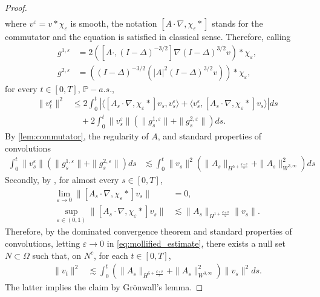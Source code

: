 \documentclass[a4paper,10pt]{amsart}
\renewcommand{\epsilon}{\varepsilon}
\theoremstyle{remark}
\numberwithin{equation}{section}
\begin{document}
\begin{proof}
\begin{align*}
\end{align*}
    where $v^{\epsilon}=v\ast \chi_{\epsilon}$ is smooth, the notation $[A\cdot\nabla,\chi_{\epsilon}\ast]$ stands for the commutator and the equation is satisfied in classical sense. Therefore, calling 
    \begin{align*}
        g^{1,\epsilon}&=2\left([A\cdot,(I-\Delta)^{-3/2}]\nabla(I-\Delta)^{3/2}v\right)\ast \chi_{\epsilon},\\
        g^{2,\epsilon}&=\left((I-\Delta)^{-3/2}\left(|A|^2(I-\Delta)^{3/2}v\right)\right)\ast\chi_{\epsilon},
    \end{align*}
    for every $t\in[0,T]$, $\mathbb{P}-a.s.$,
    \begin{align}\label{eq:mollified_estimate}
        \|v^{\epsilon}_t\|^2&\leq
        2\int_0^t\left|
        \langle [A_s\cdot\nabla,\chi_{\epsilon}\ast]v_s,v^{\epsilon}_s\rangle
        +\langle v^{\epsilon}_s,[A_s\cdot\nabla,\chi_{\epsilon}\ast]v_s\rangle
        \right|ds\\
        &\quad+2\int_0^t \|v^{\epsilon}_s\|
        \left(\|g^{1,\epsilon}_s\|+\|g^{2,\epsilon}_s\|\right)ds.
    \end{align}
    By \cref{lem:commutator}, the regularity of $A$, and standard properties of convolutions
    \begin{align*}
        \int_0^t \|v^{\epsilon}_s\|\left(\|g^{1,\epsilon}_s\|+\|g^{2,\epsilon}_s\|\right)ds& \lesssim \int_0^t \|v_s\|^2\left(\|A_s\|_{H^{5+\frac{d+\theta}{2}}}+\|A_s\|_{W^{3,\infty}}^2\right)ds
    \end{align*}
    Secondly, by \cite[Lemma 4.2]{butori2026background}, for almost every
    $s\in[0,T]$,
   \begin{align*}
       \lim_{\epsilon\rightarrow 0}\|[A_s\cdot\nabla,\chi_{\epsilon}\ast]v_s\|&=0,\\
       \sup_{\epsilon\in (0,1)}\|[A_s\cdot\nabla,\chi_{\epsilon}\ast]v_s\|&\lesssim \|A_s\|_{H^{1+\frac{d+\theta}{2}}}\|v_s\|.
   \end{align*}
	   Therefore, by the dominated convergence theorem and standard properties
	   of convolutions, letting $\epsilon\rightarrow 0$ in
	   \eqref{eq:mollified_estimate}, there exists a null set
	   $N\subset\Omega$ such that, on $N^c$, for each $t\in[0,T]$,
   \begin{align*}
       \|v_t\|^2&\lesssim \int_0^t
       \left(\|A_s\|_{H^{5+\frac{d+\theta}{2}}}
       +\|A_s\|_{W^{3,\infty}}^2\right)\|v_s\|^2ds.
   \end{align*}
   The latter implies the claim by Gr\"onwall's lemma.
\end{proof}
\end{document}
